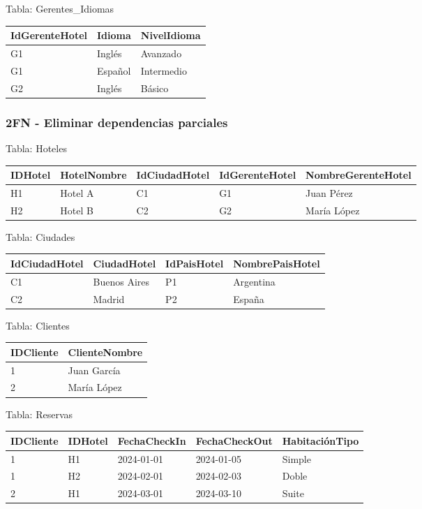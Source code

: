 \documentclass[12pt]{article}
\begin{document}
Tabla: Gerentes\_Idiomas
\begin{center}
\begin{tabular}{lll}
\toprule
IdGerenteHotel & Idioma & NivelIdioma \\
\midrule
G1 & Inglés & Avanzado \\
G1 & Español & Intermedio \\
G2 & Inglés & Básico \\
\bottomrule
\end{tabular}
\end{center}

\subsubsection{2FN - Eliminar dependencias parciales}
Tabla: Hoteles
\begin{center}
\begin{tabular}{lllll}
\toprule
IDHotel & HotelNombre & IdCiudadHotel & IdGerenteHotel & NombreGerenteHotel \\
\midrule
H1 & Hotel A & C1 & G1 & Juan Pérez \\
H2 & Hotel B & C2 & G2 & María López \\
\bottomrule
\end{tabular}
\end{center}

Tabla: Ciudades
\begin{center}
\begin{tabular}{llll}
\toprule
IdCiudadHotel & CiudadHotel & IdPaisHotel & NombrePaisHotel \\
\midrule
C1 & Buenos Aires & P1 & Argentina \\
C2 & Madrid & P2 & España \\
\bottomrule
\end{tabular}
\end{center}

Tabla: Clientes
\begin{center}
\begin{tabular}{ll}
\toprule
IDCliente & ClienteNombre \\
\midrule
1 & Juan García \\
2 & María López \\
\bottomrule
\end{tabular}
\end{center}

Tabla: Reservas
\begin{center}
\begin{tabular}{lllll}
\toprule
IDCliente & IDHotel & FechaCheckIn & FechaCheckOut & HabitaciónTipo \\
\midrule
1 & H1 & 2024-01-01 & 2024-01-05 & Simple \\
1 & H2 & 2024-02-01 & 2024-02-03 & Doble \\
2 & H1 & 2024-03-01 & 2024-03-10 & Suite \\
\bottomrule
\end{tabular}
\end{center}
\end{document}
